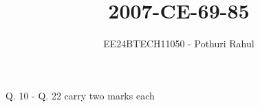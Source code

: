 \documentclass[journal]{IEEEtran}
\begin{document}

\vspace{3cm}
\title{2007-CE-69-85}
\author{EE24BTECH11050 - Pothuri Rahul}
{\let\newpage\relax\maketitle}
\renewcommand{\thefigure}{\theenumi}
\renewcommand{\thetable}{\theenumi}
\setlength{\intextsep}{10pt} %
\renewcommand{\thetable}{\theenumi}



Q. 10 - Q. 22 carry two marks each \\
\end{document}
